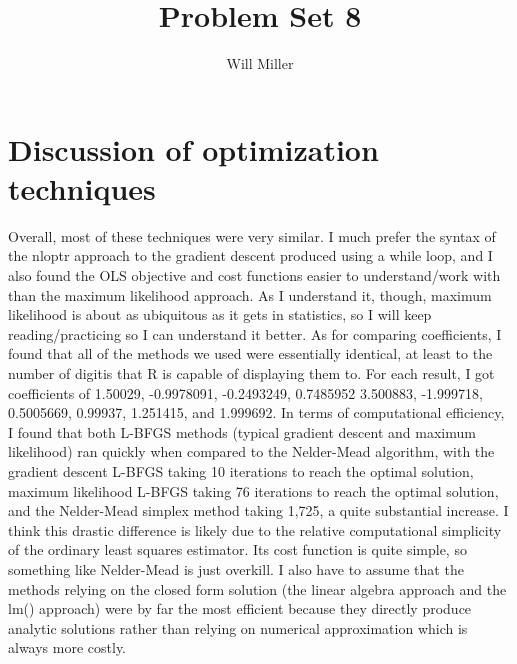 \documentclass{article}
\title{Problem Set 8}
\author{Will Miller}
\begin{document}
\maketitle


\section{Discussion of optimization techniques}

Overall, most of these techniques were very similar. I much prefer the syntax of the nloptr approach to the gradient descent produced using a while loop, and I also found the OLS objective and cost functions easier to understand/work with than the maximum likelihood approach. As I understand it, though, maximum likelihood is about as ubiquitous as it gets in statistics, so I will keep reading/practicing so I can understand it better. 
As for comparing coefficients, I found that all of the methods we used were essentially identical, at least to the number of digitis that R is capable of displaying them to. For each result, I got coefficients of 1.50029, -0.9978091, -0.2493249, 0.7485952 3.500883, -1.999718, 0.5005669, 0.99937,  1.251415, and 1.999692. 
In terms of computational efficiency, I found that both L-BFGS methods (typical gradient descent and maximum likelihood) ran quickly when compared to the Nelder-Mead algorithm, with the gradient descent L-BFGS taking 10 iterations to reach the optimal solution, maximum likelihood L-BFGS taking 76 iterations to reach the optimal solution, and the Nelder-Mead simplex method taking 1,725, a quite substantial increase. I think this drastic difference is likely due to the relative computational simplicity of the ordinary least squares estimator. Its cost function is quite simple, so something like Nelder-Mead is just overkill. 
I also have to assume that the methods relying on the closed form solution (the linear algebra approach and the lm() approach) were by far the most efficient because they directly produce analytic solutions rather than relying on numerical approximation which is always more costly.
\end{document}
